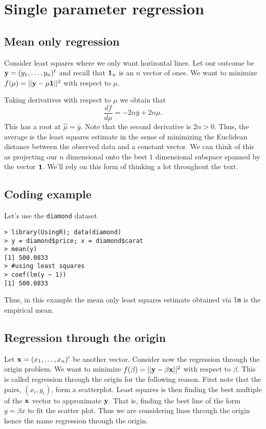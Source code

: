 \chapter{Single parameter regression}

\section{Mean only regression}
Consider least squares where we only want horizontal lines. 
Let our outcome be
$
\mathbf{y} = (y_1,\ldots, y_n)^t
$ and recall that $\mathbf{1}_n$ is an $n$ vector of ones. We want
to minimize 
$f(\mu) = ||\mathbf{y} - \mu \mathbf{1}||^2$ with respect to $\mu$. 

Taking derivatives with respect to $\mu$ we obtain that
$$
\frac{d f}{d\mu} = - 2n \bar y  + 2 n \mu.
$$
This has a root at $\hat \mu = \bar y$. Note that the second
derivative is $2n>0$. 
Thus, the average is the least squares estimate in the
sense of minimizing the Euclidean distance between the
observed data and a constant vector. We can think of this
as projecting our $n$ dimensional onto the best $1$
dimensional subspace spanned by the vector $\mathbf{1}$. We'll
rely on this form of thinking a lot throughout the text.

\section{Coding example}
Let's use the \texttt{diamond} dataset 
\begin{verbatim}
> library(UsingR); data(diamond)
> y = diamond$price; x = diamond$carat
> mean(y)
[1] 500.0833
> #using least squares
> coef(lm(y ~ 1))
[1] 500.0833
\end{verbatim}

Thus, in this example the mean only least squares estimate obtained via \texttt{lm} 
is the empirical mean.

\section{Regression through the origin}

Let $\mathbf{x} = (x_1,\ldots, x_n)'$ be another vector. Consider now the
regression through the origin problem. We want to minimize
$f(\beta) = ||\mathbf{y} - \beta \mathbf{x}||^2$ with respect to $\beta$.
This is called regression through the origin for the following
reason. First note that the pairs, $(x_i, y_i)$,
form a scatterplot. Least squares is then finding the best
multiple of the $\mathbf{x}$ vector to approximate $\mathbf{y}$. That is,
finding the best line of the form $y = \beta x$ to fit
the scatter plot. Thus we are considering lines through the origin
hence the name regression through the origin.

